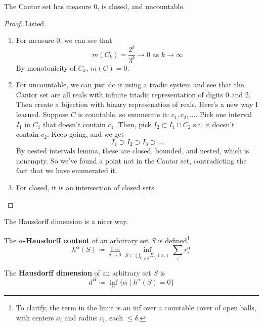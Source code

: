  \begin{theorem}
    The Cantor set has measure $0$, is closed, and uncountable. 
  \end{theorem}
  \begin{proof}
    Listed. 
    \begin{enumerate}
      \item For measure $0$, we can see that 
      \begin{equation}
        m(C_k) = \frac{2^k}{3^k} \to 0 \text{ as } k \to \infty 
      \end{equation}
      By monotonicity of $C_k$, $m(C) = 0$. 

      \item For uncountable, we can just do it using a tradic system and see that the Cantor set are all reals with infinite triadic representation of digits $0$ and $2$. Then create a bijection with binary represenation of reals. Here's a new way I learned. Suppose $C$ is countable, so enumerate it: $c_1, c_2, \ldots$. Pick one interval $I_1$ in $C_1$ that doesn't contain $c_1$. Then, pick $I_2 \subset I_1 \cap C_2$ s.t. it doesn't contain $c_2$. Keep going, and we get 
      \begin{equation}
        I_1 \supset I_2 \supset I_3 \supset \ldots 
      \end{equation}
      By nested intervals lemma, these are closed, bounded, and nested, which is nonempty. So we've found a point not in the Cantor set, contradicting the fact that we have enumerated it. 

      \item For closed, it is an intersection of closed sets. 
    \end{enumerate}
  \end{proof}

  The Hausdorff dimension is a nicer way. 

  \begin{definition}
    The \textbf{$\alpha$-Hausdorff content} of an arbitrary set $S$ is defined\footnote{To clarify, the term in the limit is an inf over a countable cover of open balls, with centers $x_i$ and radius $r_i$, each $\leq \delta$. }
    \begin{equation}
      h^\alpha (S) \coloneqq \lim_{\delta \to 0} \inf_{S \subset \bigcup_{r_i \leq \delta } B_{r_i} (x_i)} \sum_i r_i^\alpha
    \end{equation}
  \end{definition}

  \begin{definition}
    The \textbf{Hausdorff dimension} of an arbitrary set $S$ is 
    \begin{equation}
      d^H \coloneqq \inf_\alpha \{\alpha \mid h^\alpha(S) = 0 \} 
    \end{equation}
  \end{definition}


